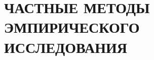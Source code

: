 \section[Частные методы эмпирического исследования]{%
  ЧАСТНЫЕ МЕТОДЫ ЭМПИРИЧЕСКОГО \\ ИССЛЕДОВАНИЯ
}


\pagebreak
